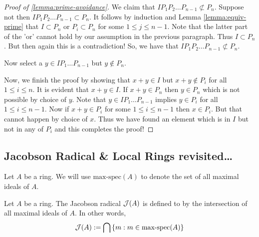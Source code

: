 \begin{proof}[Proof of \ref{lemma:prime-avoidance}]
    We claim that $IP_1 P_2 \ldots P_{n-1} \not\subset P_n$. Suppose not then $I P_1 P_2 \ldots P_{n-1} \subset P_n$. It follows by induction and Lemma \ref{lemma:equiv-prime} that $I \subset P_n$ or $P_i \subset P_n$ for some $1\le j \le n-1$. Note that the latter part of the 'or' cannot hold by our assumption in the previous paragraph. Thus $I \subset P_n$. But then again this is a contradiction! So, we have that $IP_1 P_2 \ldots P_{n-1} \not\subset P_n$.

    Now select a $y\in IP_1 \ldots P_{n-1}$ but $y\not \in P_n$.

    Now, we finish the proof by showing that $x+y \in I$ but $x+y \not \in P_i$ for all $1\le i \le n$. It is evident that $x+y \in I$. If $x+y\in P_n$ then $y\in P_n$ which is not possible by choice of $y$. Note that $y\in IP_1\ldots P_{n-1}$ implies $y\in P_i$ for all $1\le i\le n-1$. Now if $x+y \in P_i$ for some $1\le i \le n-1$ then $x \in P_i$. But that cannot happen by choice of $x$. Thus we have found an element which is in $I$ but not in any of $P_i$ and this completes the proof!

\end{proof}

\subsection{Jacobson Radical \& Local Rings revisited\ldots }

\begin{notation}
    Let $A$ be a ring. We will use $\text{max-spec} (A)$ to denote the set of all maximal ideals of $A$.
\end{notation}


\begin{definition}
    Let $A$ be a ring. The Jacobson radical ${\cal J} (A)$ is defined to by the intersection of all maximal ideals of $A$. In other words,
    \begin{equation*}
	{\cal J} (A) := \bigcap \left\{ m : m \in \text{max-spec} (A) \right\}
    \end{equation*}
    \label{def:Jacobson}
\end{definition}

